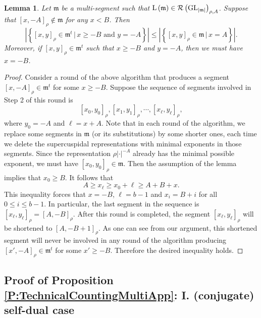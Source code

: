 \documentclass[11pt,letterpaper]{amsart}
\theoremstyle{plain}
\newcounter{theorem}[section]
\numberwithin{theorem}{section}
\numberwithin{equation}{subsection}
\newtheorem{Lem}[theorem]{Lemma}
\theoremstyle{remark}
\newcommand{\GL}{\operatorname{GL}}
\def\calR{\mathcal{R}}
\begin{document}
\begin{Lem}\label{L:CountSegmentInZeleData}
Let $\mathfrak{m}$ be a multi-segment such that ${\rm L}\left(\mathfrak{m}\right)\in\calR\left(\GL_{|\mathfrak{m}|}\right)_{\rho,A}$. Suppose that $\left[x,-A\right]_\rho\notin\mathfrak{m}$ for any $x<B$. Then
\[
    \left|\left\{\left[x,y\right]_\rho\in\mathfrak{m}^t\,\big|\,x\geq -B \text{ and } y=-A\right\}\right| \leq \left|\left\{\left[x,y\right]_\rho\in\mathfrak{m}\,\big|\,x=A\right\}\right|.
\]
Moreover, if $\left[x,y\right]_\rho\in\mathfrak{m}^t$ such that $x\geq -B$ and $y=-A$, then we must have $x=-B$. 
\end{Lem}

\vskip 5pt

\begin{proof}
Consider a round of the above algorithm that produces a segment $\left[x,-A\right]_\rho\in\mathfrak{m}^t$ for some $x\geq -B$. Suppose the sequence of segments involved in Step 2 of this round is 
\[
    \left[x_0,y_0\right]_\rho, \left[x_1,y_1\right]_\rho, \cdots, \left[x_\ell,y_\ell\right]_\rho,
\]
where $y_0=-A$ and $\ell = x+A$. Note that in each round of the algorithm, we replace some segments in $\mathfrak{m}$ (or its substitutions) by some shorter ones, each time we delete the supercuspidal representations with minimal exponents in those segments. Since the representation $\rho|\cdot|^{-A}$ already has the minimal possible exponent, we must have $\left[x_0,y_0\right]_\rho\in\mathfrak{m}$. Then the assumption of the lemma implies that $x_0\geq B$. It follows that
\[
    A \geq x_\ell\geq x_0 + \ell\geq A+B+x.
\]
This inequality forces that $x=-B$, $\ell=b-1$ and $x_i=B+i$ for all $0\leq i\leq b-1$. In particular, the last segment in the sequence is $\left[x_\ell,y_\ell\right]_\rho = \left[A,-B\right]_\rho$. After this round is completed, the segment $\left[x_\ell,y_\ell\right]_\rho$ will be shortened to $\left[A,-B+1\right]_\rho$. As one can see from our argument, this shortened segment will never be involved in any round of the algorithm producing $\left[x',-A\right]_\rho\in\mathfrak{m}^t$ for some $x'\geq -B$. Therefore the desired inequality holds.

\end{proof}

\vskip 5pt


\subsection{Proof of Proposition \ref{P:TechnicalCountingMultiApp}: I. (conjugate) self-dual case} %
\label{sub:proof_of_proposition_p:technicalcountingmultiapp_i_conjugate_self_dual_case}
\end{document}
